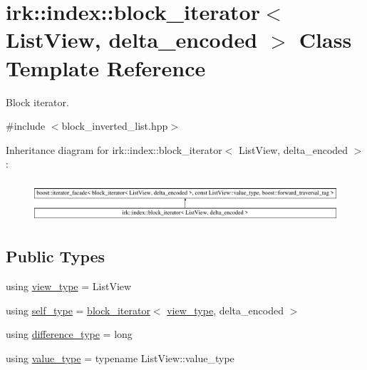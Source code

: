 \hypertarget{classirk_1_1index_1_1block__iterator}{}\section{irk\+:\+:index\+:\+:block\+\_\+iterator$<$ List\+View, delta\+\_\+encoded $>$ Class Template Reference}
\label{classirk_1_1index_1_1block__iterator}


Block iterator.  




{\ttfamily \#include $<$block\+\_\+inverted\+\_\+list.\+hpp$>$}

Inheritance diagram for irk\+:\+:index\+:\+:block\+\_\+iterator$<$ List\+View, delta\+\_\+encoded $>$\+:\begin{figure}[H]
\begin{center}
\leavevmode
\includegraphics[height=1.523810cm]{classirk_1_1index_1_1block__iterator}
\end{center}
\end{figure}
\subsection*{Public Types}
\begin{DoxyCompactItemize}
\item 
using \mbox{\hyperlink{classirk_1_1index_1_1block__iterator_a75bc89b691db97f719af7284ee91afa0}{view\+\_\+type}} = List\+View
\item 
using \mbox{\hyperlink{classirk_1_1index_1_1block__iterator_a338ee8fee726492e9f8bbad4b4d75766}{self\+\_\+type}} = \mbox{\hyperlink{classirk_1_1index_1_1block__iterator}{block\+\_\+iterator}}$<$ \mbox{\hyperlink{classirk_1_1index_1_1block__iterator_a75bc89b691db97f719af7284ee91afa0}{view\+\_\+type}}, delta\+\_\+encoded $>$
\item 
using \mbox{\hyperlink{classirk_1_1index_1_1block__iterator_a3a314c46329b349e7534670b21978ab6}{difference\+\_\+type}} = long
\item 
using \mbox{\hyperlink{classirk_1_1index_1_1block__iterator_a4d6c5b58cedd871e8a8f235e425e8587}{value\+\_\+type}} = typename List\+View\+::value\+\_\+type
\end{DoxyCompactItemize}

